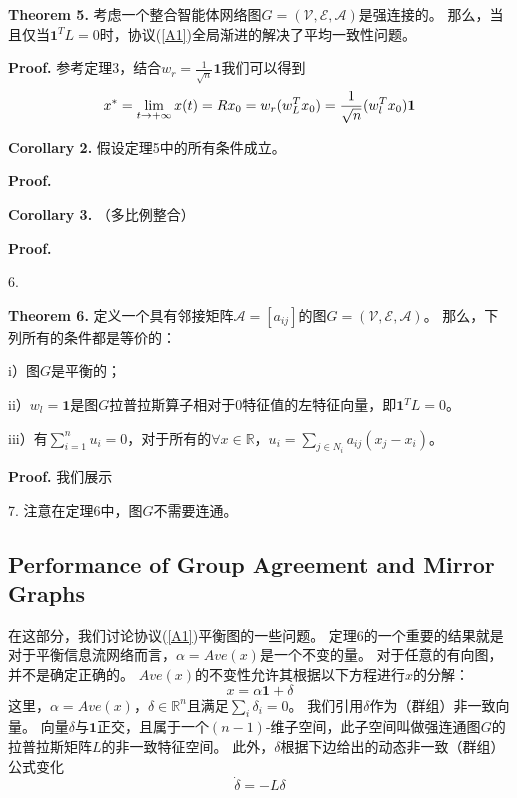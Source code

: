 \documentclass{article}
\begin{document}
\noindent \textbf{Theorem 5.} 考虑一个整合智能体网络图$G=(\mathcal{V}, \mathcal{E}, \mathcal{A})$是强连接的。
那么，当且仅当$\mathbf{1}^TL=0$时，协议(\ref{A1})全局渐进的解决了平均一致性问题。

\noindent \textbf{Proof.} 参考定理3，结合$w_r = \frac{1}{\sqrt{n}}\mathbf{1}$我们可以得到
\begin{equation}
    x^* = \lim_{t\rightarrow +\infty}x(t) = Rx_0 = w_r(w_L^T x_0) = \frac{1}{\sqrt{n}}(w_l^Tx_0)\mathbf{1}
    \notag
\end{equation}




\noindent \textbf{Corollary 2.} 假设定理5中的所有条件成立。

\noindent \textbf{Proof.}

\noindent \textbf{Corollary 3.} （多比例整合）

\noindent \textbf{Proof.}

 6. 

\noindent \textbf{Theorem 6.} 定义一个具有邻接矩阵$\mathcal{A}=[a_{ij}]$的图$G=(\mathcal{V}, \mathcal{E}, \mathcal{A})$。
那么，下列所有的条件都是等价的：

i）图$G$是平衡的；

ii）$w_l = \mathbf{1}$是图$G$拉普拉斯算子相对于0特征值的左特征向量，即$\mathbf{1}^TL = 0$。

iii）有$\sum_{i=1}^n u_i = 0$，对于所有的$\forall x \in \mathbb{R}$，$u_i = \sum_{j\in N_i}a_{ij}(x_j - x_i)$。

\noindent \textbf{Proof.} 我们展示


 7. 注意在定理6中，图$G$不需要连通。

\subsection{Performance of Group Agreement and Mirror Graphs}
在这部分，我们讨论协议(\ref{A1})平衡图的一些问题。
定理6的一个重要的结果就是对于平衡信息流网络而言，$\alpha = Ave(x)$是一个不变的量。
对于任意的有向图，并不是确定正确的。
$Ave(x)$的不变性允许其根据以下方程进行$x$的分解：
\begin{equation}
    x = \alpha \mathbf{1} + \delta
    \tag{22}
\end{equation}
这里，$\alpha = Ave(x)$，$\delta\in \mathbb{R}^n$且满足$\sum_i\delta_i=0$。
我们引用$\delta$作为（群组）非一致向量。
向量$\delta$与$\mathbf{1}$正交，且属于一个$(n-1)$-维子空间，此子空间叫做强连通图$G$的拉普拉斯矩阵$L$的非一致特征空间。
此外，$\delta$根据下边给出的动态非一致（群组）公式变化
\begin{equation}
    \dot{\delta} = -L\delta
    \tag{23}
\end{equation}
\end{document}
